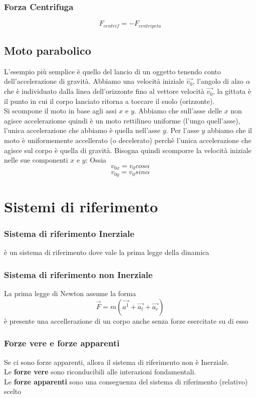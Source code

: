 \documentclass[a4paper]{report}
\begin{document}
  \subsection{Forza Centrifuga}
  $$ F_{centrif} = - F_{centripeta} $$


  \section{Moto parabolico}
  L'esempio più semplice è quello del lancio di un oggetto tenendo conto dell'accelerazione di gravità. Abbiamo una velocità iniziale $\vec{v_0}$, l'angolo di alzo $\alpha$ che è individuato dalla linea dell'orizzonte fino al vettore velocità $\vec{v_0}$, la gittata è il punto in cui il corpo lanciato ritorna a toccare il suolo (orizzonte).\\
  Si scompone il moto in base agli assi $x$ e $y$. Abbiamo che sull'asse delle $x$ non agisce acceleraziome quindi è un moto rettilineo uniforme (l'ungo quell'asse), l'unica accelerazione che abbiamo è quella nell'asse $y$.
  Per l'asse $y$ abbiamo che il moto è uniformemente accellerato (o decelerato) perchè l'unica accelerazione che agisce sul corpo è quella di gravità.
  Bisogna quindi scomporre la velocità iniziale nelle sue componenti $x$ e $y$: Ossia
  $$v_{0x} = v_0 cos\alpha$$
  $$v_{0y} = v_0 sin\alpha$$


  \chapter{Sistemi di riferimento}
  \subsection{Sistema di riferimento Inerziale}
  è un sistema di riferimento dove vale la prima legge della dinamica
  \subsection{Sistema di riferimento non Inerziale}
  La prima legge di Newton assume la forma
  $$ \vec{F} = m(\vec{a^1} + \vec{a_t} + \vec{a_c}) $$
  è presente una accellerazione di un corpo anche senza forze esercitate su di esso
  \subsection{Forze vere e forze apparenti}
  Se ci sono forze apparenti, allora il sistema di riferimento non è Inerziale. \\
  Le \textbf{forze vere} sono riconducibili alle interazioni fondamentali.\\
  Le \textbf{forze apparenti} sono una conseguenza del sistema di riferimento (relativo) scelto
\end{document}
